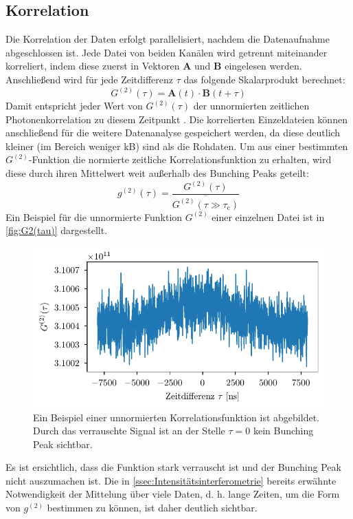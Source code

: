 \subsection{Korrelation}
\label{ssec:Korrelation}
Die Korrelation der Daten erfolgt parallelisiert, nachdem die Datenaufnahme abgeschlossen ist. 
Jede Datei von beiden Kanälen wird getrennt miteinander korreliert, indem diese zuerst in Vektoren $\mathbf{A}$ und $\mathbf{B}$ eingelesen werden. 
Anschließend wird für jede Zeitdifferenz $\tau$ das folgende Skalarprodukt berechnet: 
\begin{equation}
    G^{(2)}(\tau) = \mathbf{A}(t)\cdot\mathbf{B}(t+\tau)
    \label{eq:korrelation}
\end{equation}
Damit entspricht jeder Wert von $G^{(2)}(\tau)$ der unnormierten zeitlichen Photonenkorrelation zu diesem Zeitpunkt \cite{zmijaOpticalIntensityInterferometry2021}. 
Die korrelierten Einzeldateien können anschließend für die weitere Datenanalyse gespeichert werden, da diese deutlich kleiner (im Bereich weniger kB) sind als die Rohdaten. 
Um aus einer bestimmten $G^{(2)}$-Funktion die normierte zeitliche Korrelationsfunktion zu erhalten, wird diese durch ihren Mittelwert weit außerhalb des Bunching Peaks geteilt:
\begin{equation}
    g^{(2)}(\tau) = \frac{G^{(2)}(\tau)}{\overline{G^{(2)}(\tau\gg\tau_{\mathrm{c}})}}
    \label{eq:G2 normalisierung}
\end{equation}
Ein Beispiel für die unnormierte Funktion $G^{(2)}$ einer einzelnen Datei ist in \autoref{fig:G2(tau)} dargestellt. 
\begin{figure}[h]
    \centering
    \includegraphics{images/Datenaufnahme/G2.pdf}
    \caption{Ein Beispiel einer unnormierten Korrelationsfunktion ist abgebildet. Durch das verrauschte Signal ist an der Stelle $\tau=0$ kein Bunching Peak sichtbar.}
    \label{fig:G2(tau)}
\end{figure}
Es ist ersichtlich, dass die Funktion stark verrauscht ist und der Bunching Peak nicht auszumachen ist. 
Die in \autoref{ssec:Intensitätsinterferometrie} bereits erwähnte Notwendigkeit der Mittelung über viele Daten, d. h. lange Zeiten, um die Form von $g^{(2)}$ bestimmen zu können, ist daher deutlich sichtbar. 

